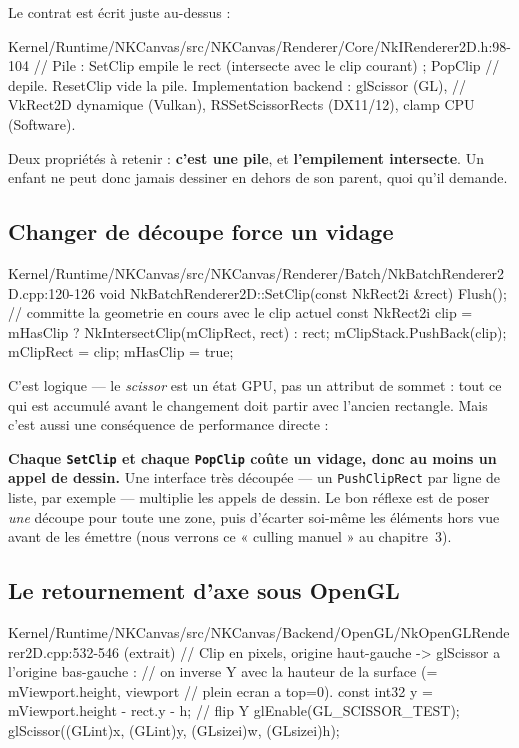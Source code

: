 Le contrat est écrit juste au-dessus :

\begin{nkcode}{Kernel/Runtime/NKCanvas/src/NKCanvas/Renderer/Core/NkIRenderer2D.h:98-104}
// Pile : SetClip empile le rect (intersecte avec le clip courant) ; PopClip
// depile. ResetClip vide la pile. Implementation backend : glScissor (GL),
// VkRect2D dynamique (Vulkan), RSSetScissorRects (DX11/12), clamp CPU (Software).
\end{nkcode}

Deux propriétés à retenir : \textbf{c'est une pile}, et \textbf{l'empilement
intersecte}. Un enfant ne peut donc jamais dessiner en dehors de son parent,
quoi qu'il demande.

\subsection{Changer de découpe force un vidage}

\begin{nkcode}{Kernel/Runtime/NKCanvas/src/NKCanvas/Renderer/Batch/NkBatchRenderer2D.cpp:120-126}
void NkBatchRenderer2D::SetClip(const NkRect2i &rect) {
    Flush(); // committe la geometrie en cours avec le clip actuel
    const NkRect2i clip = mHasClip ? NkIntersectClip(mClipRect, rect) : rect;
    mClipStack.PushBack(clip);
    mClipRect = clip;
    mHasClip = true;
}
\end{nkcode}

C'est logique — le \emph{scissor} est un état GPU, pas un attribut de sommet :
tout ce qui est accumulé avant le changement doit partir avec l'ancien
rectangle. Mais c'est aussi une conséquence de performance directe :

\begin{nkretenir}
\textbf{Chaque \texttt{SetClip} et chaque \texttt{PopClip} coûte un vidage,
donc au moins un appel de dessin.} Une interface très découpée — un
\texttt{PushClipRect} par ligne de liste, par exemple — multiplie les appels de
dessin. Le bon réflexe est de poser \emph{une} découpe pour toute une zone, puis
d'écarter soi-même les éléments hors vue avant de les émettre (nous verrons ce
« culling manuel » au chapitre~3).
\end{nkretenir}

\subsection{Le retournement d'axe sous OpenGL}

\begin{nkcode}{Kernel/Runtime/NKCanvas/src/NKCanvas/Backend/OpenGL/NkOpenGLRenderer2D.cpp:532-546 (extrait)}
    // Clip en pixels, origine haut-gauche -> glScissor a l'origine bas-gauche :
    // on inverse Y avec la hauteur de la surface (= mViewport.height, viewport
    // plein ecran a top=0).
    const int32 y = mViewport.height - rect.y - h; // flip Y
    glEnable(GL_SCISSOR_TEST);
    glScissor((GLint)x, (GLint)y, (GLsizei)w, (GLsizei)h);
\end{nkcode}

